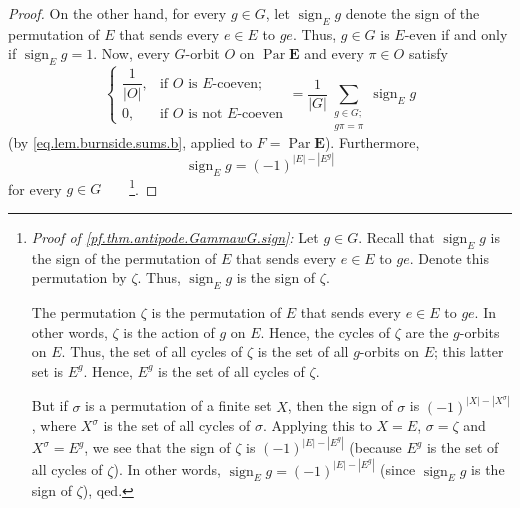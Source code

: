 \documentclass[12pt]{article}
\theoremstyle{plain}
\theoremstyle{definition}
\theoremstyle{remark}
\let\sumnonlimits\sum
\renewcommand{\sum}{\sumnonlimits\limits}
\newcommand{\Par}{\operatorname{Par}}
\newcommand{\sign}{\operatorname{sign}}
\newcommand{\EE}{{\mathbf{E}}}
\begin{document}
\begin{proof}
On the other hand, for every $g\in G$, let $\sign_E g$
denote the sign of the permutation of $E$ that sends every
$e\in E$ to $ge$. Thus, $g\in G$ is $E$-even if and only if
$\sign_E g = 1$. Now, every $G$-orbit $O$ on $\Par \EE $
and every $\pi\in O$ satisfy%
\begin{equation}%
\begin{cases}
\dfrac{1}{\left\vert O\right\vert }, & \text{if }O\text{ is }E\text{-coeven};\\
0, & \text{if }O\text{ is not }E\text{-coeven}%
\end{cases}
=\dfrac{1}{\left\vert G\right\vert }\sum_{\substack{g\in G; \\ g\pi = \pi}}
\sign_E g
\label{pf.thm.antipode.GammawG.signed}
\end{equation}
(by \eqref{eq.lem.burnside.sums.b}, applied to $F = \Par\EE$). Furthermore,
\begin{equation}
\sign_E g = \left(  -1\right)  ^{\left\vert
E\right\vert -\left\vert E^{g}\right\vert }
\label{pf.thm.antipode.GammawG.sign}
\end{equation}
for every $g\in G$\ \ \ \ \footnote{\textit{Proof of
\eqref{pf.thm.antipode.GammawG.sign}:} Let $g\in G$. Recall that
$\sign_E g$ is the sign of the permutation of $E$
that sends every $e\in E$ to $ge$. Denote this permutation by $\zeta$.
Thus, $\sign_E g$ is the sign of $\zeta$.
\par
The permutation $\zeta$ is the permutation of $E$
that sends every $e \in E$ to $ge$. In other words,
$\zeta$ is the action of $g$ on $E$.
Hence, the cycles of $\zeta$ are the $g$-orbits on $E$.
Thus, the set of all cycles of $\zeta$ is the set
of all $g$-orbits on $E$; this latter set is $E^g$.
Hence, $E^g$ is the set of all cycles of $\zeta$.
\par
But if $\sigma$ is a permutation of a
finite set $X$, then the sign of $\sigma$ is $\left(  -1\right)  ^{\left\vert
X\right\vert -\left\vert X^{\sigma}\right\vert }$, where $X^{\sigma}$ is the
set of all cycles of $\sigma$. Applying this to $X=E$,
$\sigma=\zeta$ and $X^{\sigma}=E^{g}$, we see that the sign of $\zeta$
is $\left(  -1\right)  ^{\left\vert
E\right\vert -\left\vert E^{g}\right\vert }$
(because $E^g$ is the set of all cycles of $\zeta$).
In other words,
$\sign_E g = \left(  -1\right)  ^{\left\vert
E\right\vert -\left\vert E^{g}\right\vert }$ (since
$\sign_E g$ is the sign of $\zeta$), qed.}.



\end{proof}
\end{document}
